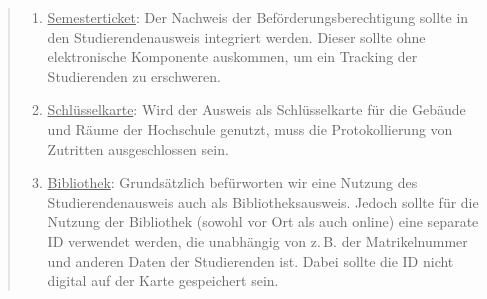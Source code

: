 \documentclass[10pt,oneside]{scrartcl}
\begin{document}
\begin{quote}
\begin{enumerate}
  \item{\underline{Semesterticket}: Der Nachweis der Beförderungsberechtigung sollte in den Studierendenausweis integriert werden. Dieser sollte ohne elektronische Komponente auskommen, um ein Tracking der Studierenden zu erschweren.}
  \item{\underline{Schlüsselkarte}: Wird der Ausweis als Schlüsselkarte für die Gebäude und Räume der Hochschule genutzt, muss die Protokollierung von Zutritten ausgeschlossen sein.}
  \item{\underline{Bibliothek}: Grundsätzlich befürworten wir eine Nutzung des Studierendenausweis auch als Bibliotheksausweis. Jedoch sollte für die Nutzung der Bibliothek (sowohl vor Ort als auch online) eine separate ID verwendet werden, die unabhängig von z.\,B. der Matrikelnummer und anderen Daten der Studierenden ist. Dabei sollte die ID nicht digital auf der Karte gespeichert sein.}
\end{enumerate}

\end{quote}
\end{document}
